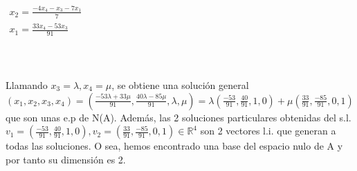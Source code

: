 \documentclass[11pt, a4paper]{article}
\newif\IfInSansMode
\newcommand{\R}{\mathbb{R}} \newcommand{\N}{\mathbb{N}}
\theoremstyle{theorem-style}
\theoremstyle{definition-style}
\theoremstyle{remark-style}
\theoremstyle{example-style}
\begin{document}
$\begin{array}{c} x_2=\frac{-4x_4-x_3-7x_1}{7} \\ x_1 = \frac{33x_4-53x_3}{91} \end{array} $ \\ \\ \\ \\

Llamando $x_3 = \lambda, x_4 = \mu$, se obtiene una solución general
$(x_1,x_2,x_3,x_4) = (\frac{-53\lambda+33\mu}{91},\frac{40\lambda-85\mu}{91},\lambda,\mu) = \lambda(\frac{-53}{91},\frac{40}{91},1,0)+\mu(\frac{33}{91},\frac{-85}{91},0,1)$ que son unas e.p de N(A). Además, las 2 soluciones particulares obtenidas del s.l. $v_1 = (\frac{-53}{91},\frac{40}{91},1,0), v_2 = (\frac{33}{91},\frac{-85}{91},0,1) \in \R^4$ son 2 vectores l.i. que generan a todas las soluciones. O sea, hemos encontrado una base del espacio nulo de A y por tanto su dimensión es 2.

















\end{document}
